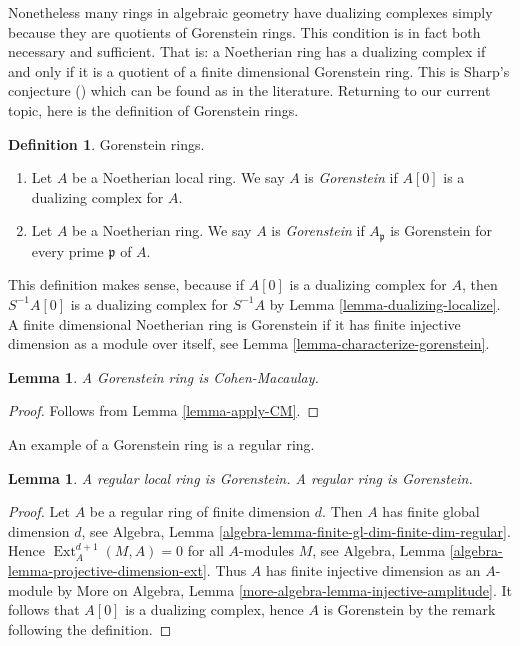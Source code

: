 \documentclass{stacks-project}
\theoremstyle{plain}
\newtheorem{lemma}[subsection]{Lemma}
\theoremstyle{definition}
\newtheorem{definition}[subsection]{Definition}
\theoremstyle{remark}
\numberwithin{equation}{subsection}
\def\Ext{\mathop{\mathrm{Ext}}\nolimits}
\begin{document}
\medskip\noindent
Nonetheless many rings in algebraic geometry have dualizing complexes
simply because they are quotients of Gorenstein rings. This condition
is in fact both necessary and sufficient. That is: a Noetherian ring
has a dualizing complex if and only if it is a quotient of a finite
dimensional Gorenstein ring. This is Sharp's conjecture (\cite{Sharp})
which can be found as \cite[Corollary 1.4]{Kawasaki} in the literature.
Returning to our current topic, here is the definition of Gorenstein rings.

\begin{definition}
\label{definition-gorenstein}
Gorenstein rings.
\begin{enumerate}
\item Let $A$ be a Noetherian local ring. We say $A$ is {\it Gorenstein}
if $A[0]$ is a dualizing complex for $A$.
\item Let $A$ be a Noetherian ring. We say $A$ is {\it Gorenstein}
if $A_\mathfrak p$ is Gorenstein for every prime $\mathfrak p$ of $A$.
\end{enumerate}
\end{definition}

\noindent
This definition makes sense, because if $A[0]$ is a dualizing complex
for $A$, then $S^{-1}A[0]$ is a dualizing complex for $S^{-1}A$ by
Lemma \ref{lemma-dualizing-localize}.
A finite dimensional Noetherian ring is Gorenstein
if it has finite injective dimension as a module over itself, see
Lemma \ref{lemma-characterize-gorenstein}.

\begin{lemma}
\label{lemma-gorenstein-CM}
A Gorenstein ring is Cohen-Macaulay.
\end{lemma}

\begin{proof}
Follows from Lemma \ref{lemma-apply-CM}.
\end{proof}

\noindent
An example of a Gorenstein ring is a regular ring.

\begin{lemma}
\label{lemma-regular-gorenstein}
A regular local ring is Gorenstein.
A regular ring is Gorenstein.
\end{lemma}

\begin{proof}
Let $A$ be a regular ring of finite dimension $d$. Then $A$ has finite
global dimension $d$, see
Algebra, Lemma \ref{algebra-lemma-finite-gl-dim-finite-dim-regular}.
Hence $\Ext^{d + 1}_A(M, A) = 0$ for all $A$-modules $M$, see
Algebra, Lemma \ref{algebra-lemma-projective-dimension-ext}.
Thus $A$ has finite injective dimension as an $A$-module by
More on Algebra, Lemma \ref{more-algebra-lemma-injective-amplitude}.
It follows that $A[0]$ is a dualizing complex, hence $A$ is
Gorenstein by the remark following the definition.
\end{proof}
\end{document}
